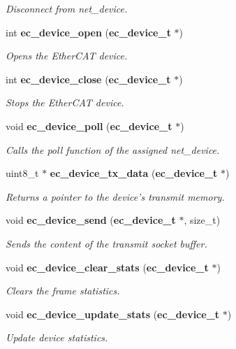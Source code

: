 \begin{DoxyCompactItemize}
\begin{DoxyCompactList}\small\item\em \-Disconnect from net\-\_\-device. \end{DoxyCompactList}\item 
int {\bf ec\-\_\-device\-\_\-open} ({\bf ec\-\_\-device\-\_\-t} $\ast$)
\begin{DoxyCompactList}\small\item\em \-Opens the \-Ether\-C\-A\-T device. \end{DoxyCompactList}\item 
int {\bf ec\-\_\-device\-\_\-close} ({\bf ec\-\_\-device\-\_\-t} $\ast$)
\begin{DoxyCompactList}\small\item\em \-Stops the \-Ether\-C\-A\-T device. \end{DoxyCompactList}\item 
void {\bf ec\-\_\-device\-\_\-poll} ({\bf ec\-\_\-device\-\_\-t} $\ast$)
\begin{DoxyCompactList}\small\item\em \-Calls the poll function of the assigned net\-\_\-device. \end{DoxyCompactList}\item 
uint8\-\_\-t $\ast$ {\bf ec\-\_\-device\-\_\-tx\-\_\-data} ({\bf ec\-\_\-device\-\_\-t} $\ast$)
\begin{DoxyCompactList}\small\item\em \-Returns a pointer to the device's transmit memory. \end{DoxyCompactList}\item 
void {\bf ec\-\_\-device\-\_\-send} ({\bf ec\-\_\-device\-\_\-t} $\ast$, size\-\_\-t)
\begin{DoxyCompactList}\small\item\em \-Sends the content of the transmit socket buffer. \end{DoxyCompactList}\item 
void {\bf ec\-\_\-device\-\_\-clear\-\_\-stats} ({\bf ec\-\_\-device\-\_\-t} $\ast$)\label{device_8h_a2889ce889e3a481040666349d4220829}

\begin{DoxyCompactList}\small\item\em \-Clears the frame statistics. \end{DoxyCompactList}\item 
void {\bf ec\-\_\-device\-\_\-update\-\_\-stats} ({\bf ec\-\_\-device\-\_\-t} $\ast$)\label{device_8h_a487e82c3004aafd09d2a2b993960ee60}

\begin{DoxyCompactList}\small\item\em \-Update device statistics. \end{DoxyCompactList}\end{DoxyCompactItemize}


